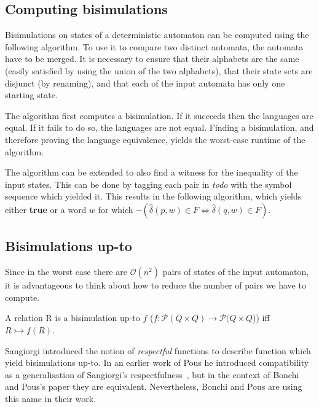 \subsection{Computing bisimulations}

Bisimulations on states of a deterministic automaton can be computed using the following algorithm.
To use it to compare two distinct automata, the automata have to be merged.
It is necessary to ensure that their alphabets are the same (easily satisfied by
using the union of the two alphabets), that their state sets are disjunct
(by renaming), and that each of the input automata has only one starting state.



The algorithm first computes a bisimulation. If it succeeds then the languages are
equal. If it fails to do so, the languages are not equal.
Finding a bisimulation, and therefore proving the language equivalence, yields
the worst-case runtime of the algorithm.

The algorithm can be extended to also find a witness for the inequality of the
input states. This can be done by tagging each pair in \textit{todo} with the
symbol sequence which yielded it. This results in the following algorithm,
which yields either \textbf{true} or a word $w$ for which
$\neg (\hat{\delta}(p, w) \in F \iff \hat{\delta}(q, w) \in F)$.



\subsection{Bisimulations up-to}

Since in the worst case there are $\mathcal{O}(n^2)$ pairs of states of the
input automaton, it is advantageous to think about how to reduce the number of
pairs we have to compute.

\begin{definition}
A relation R is a bisimulation up-to $f$
($f : \mathcal{P}(Q \times Q) \to \mathcal{P}(Q \times Q$)) iff $R \rightarrowtail f(R)$.
\end{definition}

Sangiorgi introduced the notion of \textit{respectful} functions to describe
function which yield bisimulations up-to.
In an earlier work of Pous he introduced compatibility as a generalisation of
Sangiorgi's respectfulness~\cite{pous2007complete}, but in the context of Bonchi and Pous's paper they
are equivalent. Nevertheless, Bonchi and Pous are using this name in their work.

